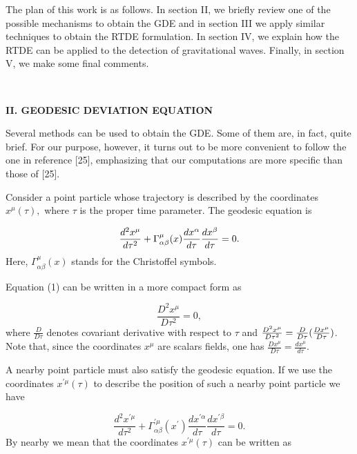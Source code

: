 \documentclass[a4paper,12pt]{article}
\begin{document}
The plan of this work is as follows. In section II, we briefly review one of
the possible mechanisms to obtain the GDE and in section III we apply
similar techniques to obtain the RTDE formulation. In section IV, we explain
how the RTDE can be applied to the detection of gravitational waves.
Finally, in section V, we make some final comments.

\bigskip \smallskip \bigskip\ 

\noindent \textbf{II. GEODESIC DEVIATION EQUATION}

\bigskip

Several methods can be used to obtain the GDE. Some of them are, in fact,
quite brief. For our purpose, however, it turns out to be more convenient to
follow the one in reference [25], emphasizing that our computations are more
specific than those of [25].

Consider a point particle whose trajectory is described by the coordinates $%
x^{\mu}(\tau),$ where $\tau$ is the proper time parameter. The geodesic
equation is

\begin{equation}
\frac{d^{2}x^{\mu }}{d\tau ^{2}}+\Gamma _{\alpha \beta }^{\mu }(x)\frac{%
dx^{\alpha }}{d\tau }\frac{dx^{\beta }}{d\tau }=0.  \label{1}
\end{equation}
Here, $\Gamma _{\alpha \beta }^{\mu }(x)$ stands for the Christoffel symbols.

Equation (1) can be written in a more compact form as

\begin{equation}
\frac{D^{2}x^{\mu }}{D\tau ^{2}}=0,  \label{2}
\end{equation}
where $\frac{D}{D\tau }$ denotes covariant derivative with respect to $\tau $
and $\frac{D^{2}x^{\mu }}{D\tau ^{2}}=\frac{D}{D\tau }(\frac{Dx^{\mu }}{%
D\tau })$. Note that, since the coordinates $x^{\mu }$ are scalars fields,
one has $\frac{Dx^{\mu }}{D\tau }=\frac{dx^{\mu }}{d\tau }.$

A nearby point particle must also satisfy the geodesic equation. If we use
the coordinates $x^{\prime \mu }(\tau )$ to describe the position of such a
nearby point particle we have

\begin{equation}
\frac{d^{2}x^{\prime\mu}}{d\tau^{2}}+\Gamma_{\alpha\beta}^{\prime\mu
}(x^{\prime})\frac{dx^{\prime\alpha}}{d\tau}\frac{dx^{\prime\beta}}{d\tau}=0.
\label{3}
\end{equation}
By nearby we mean that the coordinates $x^{\prime\mu}(\tau)$ can be written
as
\end{document}
